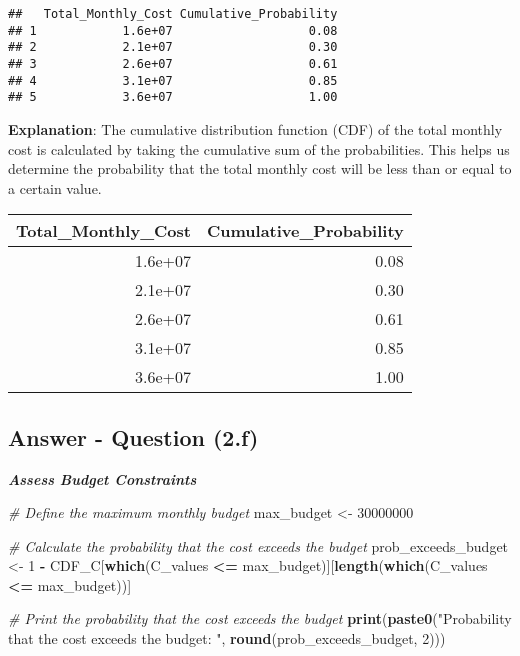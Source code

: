 \documentclass[
  11pt,
]{article}
\newenvironment{Shaded}{\begin{snugshade}}{\end{snugshade}}
\newcommand{\CommentTok}[1]{\textcolor[rgb]{0.56,0.35,0.01}{\textit{#1}}}
\newcommand{\DecValTok}[1]{\textcolor[rgb]{0.00,0.00,0.81}{#1}}
\newcommand{\FunctionTok}[1]{\textcolor[rgb]{0.13,0.29,0.53}{\textbf{#1}}}
\newcommand{\NormalTok}[1]{#1}
\newcommand{\OtherTok}[1]{\textcolor[rgb]{0.56,0.35,0.01}{#1}}
\newcommand{\SpecialCharTok}[1]{\textcolor[rgb]{0.81,0.36,0.00}{\textbf{#1}}}
\newcommand{\StringTok}[1]{\textcolor[rgb]{0.31,0.60,0.02}{#1}}
\begin{document}
\begin{verbatim}
##   Total_Monthly_Cost Cumulative_Probability
## 1            1.6e+07                   0.08
## 2            2.1e+07                   0.30
## 3            2.6e+07                   0.61
## 4            3.1e+07                   0.85
## 5            3.6e+07                   1.00
\end{verbatim}

\textbf{Explanation}: The cumulative distribution function (CDF) of the
total monthly cost is calculated by taking the cumulative sum of the
probabilities. This helps us determine the probability that the total
monthly cost will be less than or equal to a certain value.

\begin{center}
\begin{tabular}{r|r}
\hline
Total\_Monthly\_Cost & Cumulative\_Probability\\
\hline
1.6e+07 & 0.08\\
\hline
2.1e+07 & 0.30\\
\hline
2.6e+07 & 0.61\\
\hline
3.1e+07 & 0.85\\
\hline
3.6e+07 & 1.00\\
\hline
\end{tabular}
\end{center}

\subsection{Answer - Question (2.f)}\label{answer---question-2.f}

\textbf{\emph{Assess Budget Constraints}}

\begin{Shaded}
\begin{Highlighting}[]
\CommentTok{\# Define the maximum monthly budget}
\NormalTok{max\_budget }\OtherTok{\textless{}{-}} \DecValTok{30000000}

\CommentTok{\# Calculate the probability that the cost exceeds the budget}
\NormalTok{prob\_exceeds\_budget }\OtherTok{\textless{}{-}} \DecValTok{1} \SpecialCharTok{{-}}\NormalTok{ CDF\_C[}\FunctionTok{which}\NormalTok{(C\_values }\SpecialCharTok{\textless{}=}\NormalTok{ max\_budget)][}\FunctionTok{length}\NormalTok{(}\FunctionTok{which}\NormalTok{(C\_values }\SpecialCharTok{\textless{}=}\NormalTok{ max\_budget))]}

\CommentTok{\# Print the probability that the cost exceeds the budget}
\FunctionTok{print}\NormalTok{(}\FunctionTok{paste0}\NormalTok{(}\StringTok{"Probability that the cost exceeds the budget: "}\NormalTok{, }\FunctionTok{round}\NormalTok{(prob\_exceeds\_budget, }\DecValTok{2}\NormalTok{)))}
\end{Highlighting}
\end{Shaded}
\end{document}
